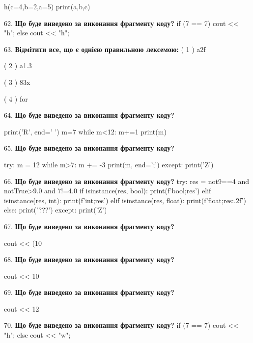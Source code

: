 \documentclass[11pt]{article}
\begin{document}
h(c=4,b=2,a=5)
print(a,b,c)
\par\vspace{5mm}
62. \textbf{Що буде виведено за виконання фрагменту коду?}
if (7 == 7)
    cout << "h";
else
    cout << "h";

\par\vspace{5mm}
63. %
\textbf{Відмітити все, що є однією правильною лексемою:}
( 1 ) a2f

( 2 ) a1.3

( 3 ) 83x

( 4 ) for
\par\vspace{5mm}
64. \textbf{Що буде виведено за виконання фрагменту коду?}

print('R', end=' ')
m=7
while m<12:
    m+=1
print(m)

\par\vspace{5mm}
65. \textbf{Що буде виведено за виконання фрагменту коду?}

try:
    m = 12
    while m>7:
        m += -3
    print(m, end=';')
except:
    print('Z')

\par\vspace{5mm}
66. \textbf{Що буде виведено за виконання фрагменту коду?}
try:
    res = not9==4 and notTrue>9.0 and 7!=4.0
    if isinstance(res, bool):
        print(f'bool;{res}')
    elif isinstance(res, int):
        print(f'int;{res}')
    elif isinstance(res, float):
        print(f'float;{res:.2f}')
    else:
        print('???')
except:
    print('Z')
\par\vspace{5mm}
67. \textbf{Що буде виведено за виконання фрагменту коду?}

cout << (10 %
\par\vspace{5mm}
68. \textbf{Що буде виведено за виконання фрагменту коду?}

cout << 10 %
\par\vspace{5mm}
69. \textbf{Що буде виведено за виконання фрагменту коду?}

cout << 12 %
\par\vspace{5mm}
70. \textbf{Що буде виведено за виконання фрагменту коду?}
if (7 == 7)
    cout << "h";
else
    cout << "w";
\end{document}
